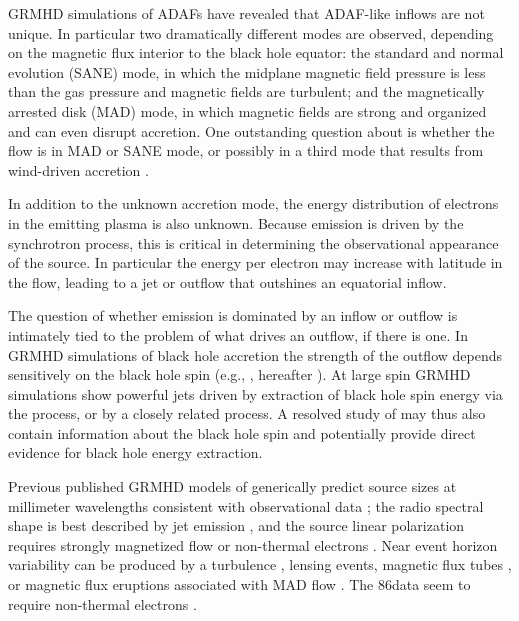GRMHD simulations of ADAFs have revealed that ADAF-like inflows are not unique.
In particular two dramatically different modes are observed, depending on the magnetic flux interior to the black hole equator: the standard and normal evolution (SANE) mode, in which the midplane magnetic field pressure is less than the gas pressure and magnetic fields are turbulent; and the magnetically arrested disk (MAD) mode, in which magnetic fields are strong and organized and can even disrupt accretion.
One outstanding question about \sgra is whether the flow is in MAD or SANE mode, or possibly in a third mode that results from wind-driven accretion \citep{2020ApJ...896L...6R}.

In addition to the unknown accretion mode, the energy distribution of electrons in the emitting plasma is also unknown.
Because emission is driven by the synchrotron process, this is critical in determining the observational appearance of the source.
In particular the energy per electron may increase with latitude in the flow, leading to a jet or outflow that outshines an equatorial inflow.

The question of whether emission is dominated by an inflow or outflow is intimately tied to the problem of what drives an outflow, if there is one.
In GRMHD simulations of black hole accretion the strength of the outflow depends sensitively on the black hole spin (e.g., \citealt{M87PaperV}, hereafter ).
At large spin GRMHD simulations show powerful jets driven by extraction of black hole spin energy via the \citet{1977MNRAS.179..433B} process, or by a closely related process.
A resolved study of \sgra may thus also contain information about the black hole spin and potentially provide direct evidence for black hole energy extraction.

Previous published GRMHD models of \sgra generically predict source sizes at millimeter wavelengths consistent with observational data \citep[e.g.,][]{2008Natur.455...78D, 2009ApJ...706..497M, 2009ApJ...703L.142D,2010ApJ...717.1092D};
the radio spectral shape is best described by jet emission \citep[e.g.,][]{2013A&A...559L...3M, 2017MNRAS.467.3604R}, and the source linear polarization requires strongly magnetized flow or non-thermal electrons \citep{2015Sci...350.1242J, 2017ApJ...837..180G, 2020MNRAS.494.4168D}.
Near event horizon variability can be produced by a turbulence \citep{2020MNRAS.497.4999D}, lensing events, magnetic flux tubes \citep{2015ApJ...812..103C}, or magnetic flux eruptions associated with MAD flow \citep{2011MNRAS.418L..79T}.
The 86\GHz data seem to require non-thermal electrons \citep{2018MNRAS.478.5209C, 2019ApJ...871...30I}.

